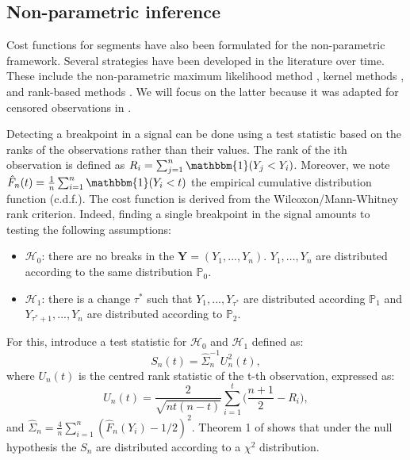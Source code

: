 \subsection{Non-parametric inference}


Cost functions for segments have also been formulated for the non-parametric framework. Several strategies have been developed in the literature over time. These include the non-parametric maximum likelihood method \citep{Zou2014,Einmahl2003}, kernel methods \citep{Harchaoui2008,li2015m}, and rank-based methods \citep{Pettitt1980,Wang2019}. We will focus on the latter because it was adapted for censored observations in \cite{lung2015}.  

Detecting a breakpoint in a signal can be done using a test statistic based on the ranks of the observations rather than their values. The rank of the ith observation is defined as $R_i = \sum_{j =1}^n\mathbbm{1}(Y_j < Y_i)$. Moreover, we note $\hat{F}_n(t) = \frac{1}{n}\sum_{i = 1}^n\mathbbm{1}(Y_i < t)$ the empirical cumulative distribution function (c.d.f.). The cost function is derived from the Wilcoxon/Mann-Whitney rank criterion. Indeed, finding a single breakpoint in the signal amounts to testing the following assumptions:
\begin{itemize}
  \item $\mathcal{H}_0$: there are no breaks in the $\bm Y = (Y_1,...,Y_n)$. $Y_1,\dots,Y_n$ are distributed according to the same distribution $\mathbb{P}_0$. 
  \item $\mathcal{H}_1$: there is a change $\tau^*$ such that $Y_1,...,Y_{\tau^*}$ are distributed according $\mathbb{P}_1$ and $Y_{\tau^*+1},...,Y_{n}$ are distributed according to $\mathbb{P}_2$. 
\end{itemize}
For this, \cite{lung2015} introduce a test statistic for $\mathcal{H}_0$ and $\mathcal{H}_1$ defined as:
\begin{equation}\label{chp2:stattestnp}
  S_n(t) = \hat{\Sigma}_n^{-1} U^2_n(t),
\end{equation}
where $U_n(t)$ is the centred rank statistic of the t-th observation, expressed as: 
\begin{equation}\label{chp2:statranknp}
  U_n(t) = \frac{2}{\sqrt{nt(n-t)}}\sum_{i = 1}^{t}\bigg(\frac{n+1}{2} - R_i\bigg),
\end{equation}
and $\hat{\Sigma}_n = \frac{4}{n}\sum_{i=1}^n(\hat{F}_n(Y_i)-1/2)^2$.
Theorem 1 of \cite{lung2015} shows that under the null hypothesis the $S_n$ are distributed according to a $\chi^2$ distribution. 

